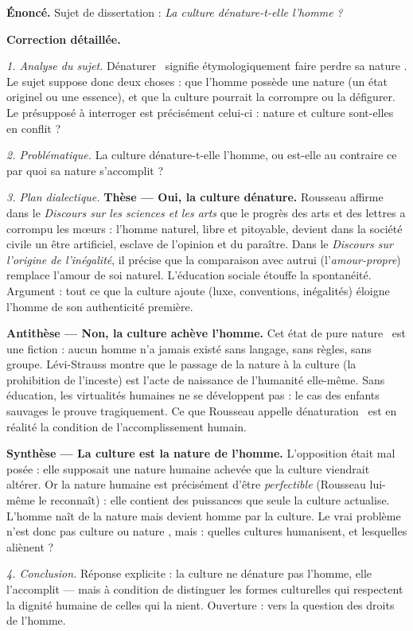 \documentclass[11pt]{article}
\begin{document}
\begin{exoresolu}
\textbf{Énoncé.} Sujet de dissertation : \emph{La culture dénature-t-elle l'homme ?}

\tcblower
\textbf{Correction détaillée.}

\emph{1. Analyse du sujet.} \guillemotleft Dénaturer \guillemotright\ signifie étymologiquement \guillemotleft faire perdre sa nature \guillemotright. Le sujet suppose donc deux choses : que l'homme possède une nature (un état originel ou une essence), et que la culture pourrait la corrompre ou la défigurer. Le présupposé à interroger est précisément celui-ci : nature et culture sont-elles en conflit ?

\emph{2. Problématique.} La culture dénature-t-elle l'homme, ou est-elle au contraire ce par quoi sa nature s'accomplit ?

\emph{3. Plan dialectique.}
\textbf{Thèse — Oui, la culture dénature.} Rousseau affirme dans le \emph{Discours sur les sciences et les arts} que le progrès des arts et des lettres a corrompu les mœurs : l'homme naturel, libre et pitoyable, devient dans la société civile un être artificiel, esclave de l'opinion et du paraître. Dans le \emph{Discours sur l'origine de l'inégalité}, il précise que la comparaison avec autrui (l'\emph{amour-propre}) remplace l'amour de soi naturel. L'éducation sociale étouffe la spontanéité. Argument : tout ce que la culture ajoute (luxe, conventions, inégalités) éloigne l'homme de son authenticité première.

\textbf{Antithèse — Non, la culture achève l'homme.} Cet état de \guillemotleft pure nature \guillemotright\ est une fiction : aucun homme n'a jamais existé sans langage, sans règles, sans groupe. Lévi-Strauss montre que le passage de la nature à la culture (la prohibition de l'inceste) est l'acte de naissance de l'humanité elle-même. Sans éducation, les virtualités humaines ne se développent pas : le cas des enfants sauvages le prouve tragiquement. Ce que Rousseau appelle \guillemotleft dénaturation \guillemotright\ est en réalité la condition de l'accomplissement humain.

\textbf{Synthèse — La culture est la nature de l'homme.} L'opposition était mal posée : elle supposait une nature humaine achevée que la culture viendrait altérer. Or la nature humaine est précisément d'être \emph{perfectible} (Rousseau lui-même le reconnaît) : elle contient des puissances que seule la culture actualise. L'homme naît de la nature mais devient homme par la culture. Le vrai problème n'est donc pas \guillemotleft culture ou nature \guillemotright, mais : quelles cultures humanisent, et lesquelles aliènent ?

\emph{4. Conclusion.} Réponse explicite : la culture ne dénature pas l'homme, elle l'accomplit — mais à condition de distinguer les formes culturelles qui respectent la dignité humaine de celles qui la nient. Ouverture : vers la question des droits de l'homme.
\end{exoresolu}
\end{document}
